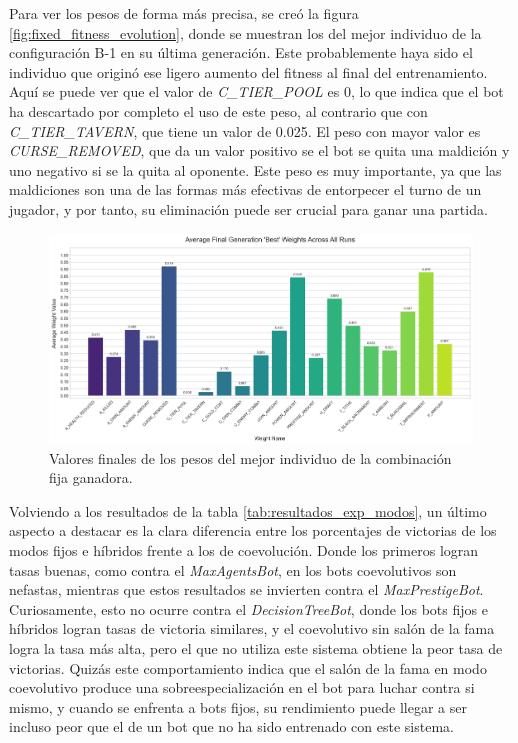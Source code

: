 Para ver los pesos de forma más precisa, se creó la figura \ref{fig:fixed_fitness_evolution}, donde se muestran los del mejor individuo de la configuración B-1 en su última generación. Este probablemente haya sido el individuo que originó ese ligero aumento del fitness al final del entrenamiento. Aquí se puede ver que el valor de \textit{C\_TIER\_POOL} es 0, lo que indica que el bot ha descartado por completo el uso de este peso, al contrario que con \textit{C\_TIER\_TAVERN}, que tiene un valor de 0.025. El peso con mayor valor es \textit{CURSE\_REMOVED}, que da un valor positivo se el bot se quita una maldición y uno negativo si se la quita al oponente. Este peso es muy importante, ya que las maldiciones son una de las formas más efectivas de entorpecer el turno de un jugador, y por tanto, su eliminación puede ser crucial para ganar una partida.

\begin{figure}[H]
	\centering
	\includegraphics[width=1.0\textwidth]{img/fixed_avg_weights_best.png}
	\caption{Valores finales de los pesos del mejor individuo de la combinación fija ganadora.}
	\label{fig:fixed_avg_weights_best}
\end{figure}

Volviendo a los resultados de la tabla \ref{tab:resultados_exp_modos}, un último aspecto a destacar es la clara diferencia entre los porcentajes de victorias de los modos fijos e híbridos frente a los de coevolución. Donde los primeros logran tasas buenas, como contra el \textit{MaxAgentsBot}, en los bots coevolutivos son nefastas, mientras que estos resultados se invierten contra el \textit{MaxPrestigeBot}. Curiosamente, esto no ocurre contra el \textit{DecisionTreeBot}, donde los bots fijos e híbridos logran tasas de victoria similares, y el coevolutivo sin salón de la fama logra la tasa más alta, pero el que no utiliza este sistema obtiene la peor tasa de victorias. Quizás este comportamiento indica que el salón de la fama en modo coevolutivo produce una sobreespecialización en el bot para luchar contra si mismo, y cuando se enfrenta a bots fijos, su rendimiento puede llegar a ser incluso peor que el de un bot que no ha sido entrenado con este sistema.

